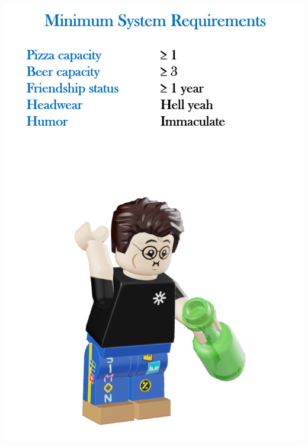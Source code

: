 \documentclass{article}
\begin{document}
\begin{songs}{}



\end{songs}


\newpage
\begin{center}
\vspace*{15em}
\includegraphics[width=\linewidth]{images/memes/backside.png}
\end{center}
\vfill
\license
\end{document}
